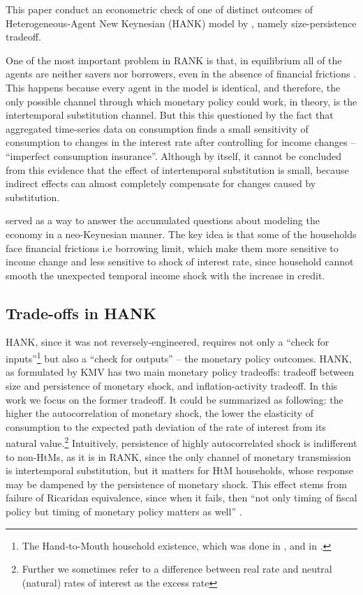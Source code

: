 \documentclass[12pt]{article}
\numberwithin{equation}{section}
\begin{document}
This paper conduct an econometric check of one of distinct outcomes of Heterogeneous-Agent New Keynesian (HANK) model by \citet[henceforth, KMV]{KMV2018}, namely size-persistence tradeoff. 


One of the most important problem in RANK is that, in equilibrium all of the agents are neither savers nor borrowers, even in the absence of financial frictions \cite{Gali2018}. 
This happens because every agent in the model is identical, and therefore, the only possible channel through which monetary policy could work, in theory, is the intertemporal substitution channel.
But this this questioned by the fact that aggregated time-series data on consumption finds a small sensitivity of consumption to changes in the interest rate after controlling for income changes \cite{Campbell1989, Canzoneri2007} -- ``imperfect consumption insurance''. 
Although by itself, it cannot be concluded from this evidence that the effect of intertemporal substitution is small, because indirect effects can almost completely compensate for changes caused by substitution.


\citet{KMV2018} served as a way to answer the accumulated questions about modeling the economy in a neo-Keynesian manner. 
The key idea is that some of the households face financial frictions i.e borrowing limit, which make them more sensitive to income change and less sensitive to shock of interest rate, since household cannot smooth the unexpected temporal income shock with the increase in credit.


\subsection{Trade-offs in HANK}

HANK, since it was not reversely-engineered, requires not only a ``check for inputs''\footnote{The Hand-to-Mouth household existence, which was done in  \citet{KVW2014}, and in \citet{Cloyne2019}.} but also a ``check for outputs'' -- the monetary policy outcomes.
HANK, as formulated by KMV has two main monetary policy tradeoffs:
tradeoff between size and persistence of monetary shock, and inflation-activity tradeoff.
In this work we focus on the former tradeoff.
It could be summarized as following: the higher the autocorrelation of monetary shock, the lower the elasticity of consumption to the expected path deviation of the rate of interest from its natural value.\footnote{Further we sometimes  refer to a difference between real rate and neutral (natural) rates of interest as the excess rate}
Intuitively, persistence of highly autocorrelated shock is indifferent to non-HtMs, as it is in RANK, since the only channel of monetary transmission is intertemporal substitution, but it matters for HtM households, whose response may be dampened by the persistence of monetary shock. 
This effect stems from failure of Ricaridan equivalence, since when it fails, then ``not only timing of fiscal policy but timing of monetary policy matters as well'' \cite{KMV2018}.
\end{document}
